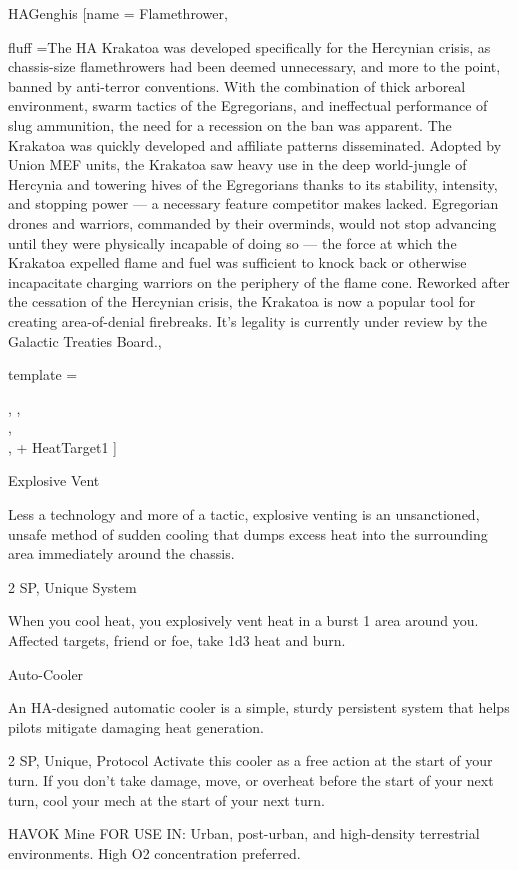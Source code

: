 \begin{mech}{HA}{Genghis}
\gearBox
[name = {Flamethrower},

fluff ={The HA Krakatoa was developed specifically for the Hercynian crisis, as chassis-size flamethrowers had been deemed unnecessary, and more to the point, banned by anti-terror conventions. With the combination of thick arboreal environment, swarm tactics of the Egregorians, and ineffectual performance of slug ammunition, the need for a recession on the ban was apparent. The Krakatoa was quickly developed and affiliate patterns disseminated. Adopted by Union MEF units, the Krakatoa saw heavy use in the deep world-jungle of Hercynia and towering hives of the Egregorians thanks to its stability, intensity, and stopping power — a necessary feature competitor makes lacked. Egregorian drones and warriors, commanded by their overminds, would not stop advancing until they were physically incapable of doing so — the force at which the Krakatoa expelled flame and fuel was sufficient to knock back or otherwise incapacitate charging warriors on the periphery of the flame cone. Reworked after the cessation of the Hercynian crisis, the Krakatoa is now a popular tool for creating area-of-denial firebreaks. It’s legality is currently under review by the Galactic Treaties Board.},

template = {\Heavy, \CQB,\\
,\\
, + HeatTarget{1}
]

Explosive Vent

Less a technology and more of a tactic, explosive venting is an unsanctioned, unsafe method of sudden cooling that dumps excess heat into the surrounding area immediately around the chassis.

2 SP, Unique
System

When you cool heat, you explosively vent heat in a burst 1 area around you. Affected targets, friend or foe, take 1d3 heat and burn.


Auto-Cooler

An HA-designed automatic cooler is a simple, sturdy persistent system that helps pilots mitigate damaging heat generation.

2 SP, Unique, Protocol
Activate this cooler as a free action at the start of your turn. If you don’t take damage, move, or overheat before the start of your next turn, cool your mech at the start of your next turn.


HAVOK Mine
FOR USE IN: Urban, post-urban, and high-density terrestrial environments. High O2  concentration preferred.

}
\end{mech}
